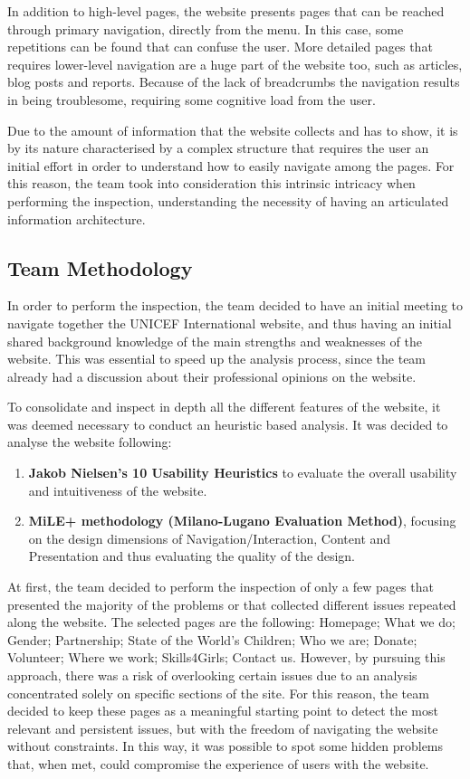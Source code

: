 In addition to high-level pages, the website presents pages that can be reached through primary navigation, directly from the menu. In this case, some repetitions can be found that can confuse the user.
More detailed pages that requires lower-level navigation are a huge part of the website too, such as articles, blog posts and reports. Because of the lack of breadcrumbs the navigation results in being troublesome, requiring some cognitive load from the user.

Due to the amount of information that the website collects and has to show, it is by its nature characterised by a complex structure that requires the user an initial effort in order to understand how to easily navigate among the pages. For this reason, the team took into consideration this intrinsic intricacy when performing the inspection, understanding the necessity of having an articulated information architecture.
\clearpage

\subsection{Team Methodology}
In order to perform the inspection, the team decided to have an initial meeting to navigate together the UNICEF International website, and thus having an initial shared background knowledge of the main strengths and weaknesses of the website. 
This was essential to speed up the analysis process, since the team already had a discussion about their professional opinions on the website.

To consolidate and inspect in depth all the different features of the website, it was deemed necessary to conduct an heuristic based analysis.
It was decided to analyse the website following:
\begin{enumerate}
    \item \textbf{Jakob Nielsen's 10 Usability Heuristics} to evaluate the overall usability and intuitiveness of the website.
    \item \textbf{MiLE+ methodology (Milano-Lugano Evaluation Method)}, focusing on the design dimensions of Navigation/Interaction, Content and Presentation and thus evaluating the quality of the design.
\end{enumerate}

At first, the team decided to perform the inspection of only a few pages that presented the majority of the problems or that collected different issues repeated along the website. The selected pages are the following: Homepage; What we do; Gender; Partnership; State of the World’s Children; Who we are; Donate; Volunteer; Where we work; Skills4Girls; Contact us.
However, by pursuing this approach, there was a risk of overlooking certain issues due to an analysis concentrated solely on specific sections of the site. For this reason, the team decided to keep these pages as a meaningful starting point to detect the most relevant and persistent issues, but with the freedom of navigating the website without constraints. In this way, it was possible to spot some hidden problems that, when met, could compromise the experience of users with the website.


